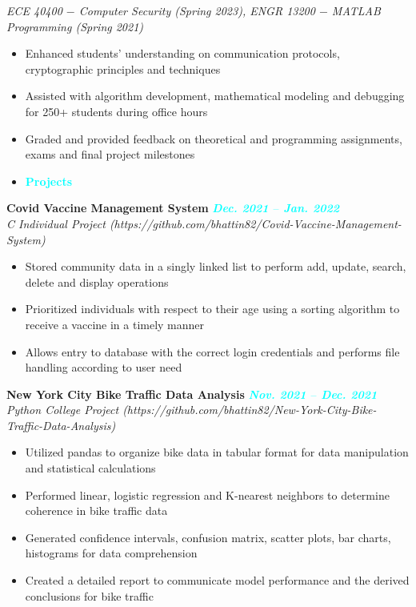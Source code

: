 \documentclass{article}
\begin{document}
\textit{ECE 40400 $-$ Computer Security (Spring 2023), ENGR 13200 $-$ MATLAB Programming (Spring 2021)}
\begin{itemize}[noitemsep, nolistsep]
    \item Enhanced students' understanding on communication protocols, cryptographic principles and techniques
    \item Assisted with algorithm development, mathematical modeling and debugging for 250+ students during office hours
    \item Graded and provided feedback on theoretical and programming assignments, exams and final project milestones \\
\end{itemize}

\begin{itemize}[noitemsep, nolistsep, leftmargin = *]
    \item[\textcolor{cyan}{\ding{228}}]\Large{\textcolor{cyan}{\textbf{Projects}}}
    \hrulefill
\end{itemize}
\textbf{Covid Vaccine Management System} \hfill \textit{\textcolor{cyan}{\textbf{Dec. 2021 $–$ Jan. 2022}}} \\
\textit{C Individual Project (https://github.com/bhattin82/Covid-Vaccine-Management-System)}
\begin{itemize}[noitemsep, nolistsep]
    \item Stored community data in a singly linked list to perform add, update, search, delete and display operations
    \item Prioritized individuals with respect to their age using a sorting algorithm to receive a vaccine in a timely manner
    \item Allows entry to database with the correct login credentials and performs file handling according to user need \\
\end{itemize}
\textbf{New York City Bike Traffic Data Analysis} \hfill \textit{\textcolor{cyan}{\textbf{Nov. 2021 $–$ Dec. 2021}}} \\
\textit{Python College Project (https://github.com/bhattin82/New-York-City-Bike-Traffic-Data-Analysis)} 
\begin{itemize}[noitemsep, nolistsep]
    \item Utilized pandas to organize bike data in tabular format for data manipulation and statistical calculations
    \item Performed linear, logistic regression and K-nearest neighbors to determine coherence in bike traffic data
    \item Generated confidence intervals, confusion matrix, scatter plots, bar charts, histograms for data comprehension
    \item Created a detailed report to communicate model performance and the derived conclusions for bike traffic \\
\end{itemize}
\end{document}
